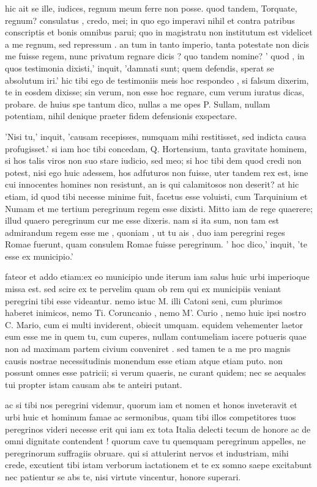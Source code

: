  hic ait se ille, iudices, regnum meum ferre non posse. quod tandem, Torquate, regnum? consulatus , credo, mei; in quo ego imperavi nihil et contra patribus conscriptis et bonis omnibus parui; quo in magistratu non institutum est videlicet a me regnum, sed repressum . an tum in tanto imperio, tanta potestate non dicis me fuisse regem, nunc privatum regnare dicis ? quo tandem nomine? ' quod , in quos testimonia dixisti,' inquit, 'damnati sunt; quem defendis, sperat se absolutum iri.' hic tibi ego de testimoniis meis hoc respondeo , si falsum dixerim, te in eosdem dixisse; sin verum, non esse hoc regnare, cum verum iuratus dicas, probare. de huius spe tantum dico, nullas a me opes P. Sullam, nullam potentiam, nihil denique praeter fidem defensionis exspectare.

 'Nisi tu,' inquit, 'causam recepisses, numquam mihi restitisset, sed indicta causa profugisset.' si iam hoc tibi concedam, Q. Hortensium, tanta gravitate hominem, si hos talis viros non suo stare iudicio, sed meo; si hoc tibi dem quod credi non potest, nisi ego huic adessem, hos adfuturos non fuisse, uter tandem rex est, isne cui innocentes homines non resistunt, an is qui calamitosos non deserit? at hic etiam, id quod tibi necesse minime fuit, facetus esse voluisti, cum Tarquinium et Numam et me tertium peregrinum regem esse dixisti. Mitto iam de rege quaerere; illud quaero peregrinum cur me esse dixeris. nam si ita sum, non tam est admirandum regem esse me , quoniam , ut tu ais , duo iam peregrini reges Romae fuerunt, quam consulem Romae fuisse peregrinum. ' hoc dico,' inquit, 'te esse ex municipio.'

 fateor et addo etiam:ex eo municipio unde iterum iam salus huic urbi imperioque missa est. sed scire ex te pervelim quam ob rem qui ex municipiis veniant peregrini tibi esse videantur. nemo istuc M. illi Catoni seni, cum plurimos haberet inimicos, nemo Ti. Coruncanio , nemo M'. Curio , nemo huic ipsi nostro C. Mario, cum ei multi inviderent, obiecit umquam. equidem vehementer laetor eum esse me in quem tu, cum cuperes, nullam contumeliam iacere potueris quae non ad maximam partem civium conveniret . sed tamen te a me pro magnis causis nostrae necessitudinis monendum esse etiam atque etiam puto. non possunt omnes esse patricii; si verum quaeris, ne curant quidem; nec se aequales tui propter istam causam abs te anteiri putant.

 ac si tibi nos peregrini videmur, quorum iam et nomen et honos inveteravit et urbi huic et hominum famae ac sermonibus, quam tibi illos competitores tuos peregrinos videri necesse erit qui iam ex tota Italia delecti tecum de honore ac de omni dignitate contendent ! quorum cave tu quemquam peregrinum appelles, ne peregrinorum suffragiis obruare. qui si attulerint nervos et industriam, mihi crede, excutient tibi istam verborum iactationem et te ex somno saepe excitabunt nec patientur se abs te, nisi virtute vincentur, honore superari.

